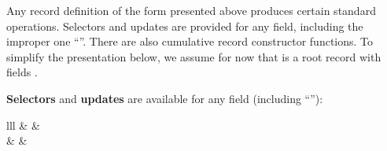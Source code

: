 \begin{isabellebody}
\begin{isamarkuptext}
\begin{descr}
  \end{descr}%
\end{isamarkuptext}%
\isamarkuptrue%
%
\isamarkuptrue%
%
\begin{isamarkuptext}%
Any record definition of the form presented above produces certain
  standard operations.  Selectors and updates are provided for any
  field, including the improper one ``''.  There are also
  cumulative record constructor functions.  To simplify the
  presentation below, we assume for now that  is a root record with fields .

  \medskip \textbf{Selectors} and \textbf{updates} are available for
  any field (including ``''):

  \begin{matharray}{lll}
     & \isa{{\isachardoublequote}{\isacharcolon}{\isacharcolon}{\isachardoublequote}} &  \\
     & \isa{{\isachardoublequote}{\isacharcolon}{\isacharcolon}{\isachardoublequote}} &  \\
  \end{matharray}


\end{isamarkuptext}
\end{isabellebody}
